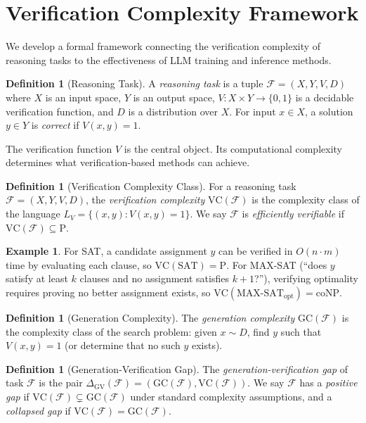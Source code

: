\documentclass{article}
\theoremstyle{definition}
\newtheorem{definition}[theorem]{Definition}
\newtheorem{example}[theorem]{Example}
\theoremstyle{remark}
\newcommand{\PTIME}{\mathrm{P}}
\newcommand{\coNP}{\mathrm{coNP}}
\newcommand{\VC}{\mathrm{VC}}           %
\newcommand{\GC}{\mathrm{GC}}           %
\newcommand{\GVGap}{\Delta_{\mathrm{GV}}} %
\newcommand{\calF}{\mathcal{F}}         %
\begin{document}
\section{Verification Complexity Framework}
\label{sec:framework}

We develop a formal framework connecting the verification complexity of reasoning tasks to the effectiveness of LLM training and inference methods.

\begin{definition}[Reasoning Task]
\label{def:task}
A \emph{reasoning task} is a tuple $\calF = (X, Y, V, D)$ where $X$ is an input space, $Y$ is an output space, $V : X \times Y \to \{0, 1\}$ is a decidable verification function, and $D$ is a distribution over $X$.
For input $x \in X$, a solution $y \in Y$ is \emph{correct} if $V(x, y) = 1$.
\end{definition}

The verification function $V$ is the central object. Its computational complexity determines what verification-based methods can achieve.

\begin{definition}[Verification Complexity Class]
\label{def:vc}
For a reasoning task $\calF = (X, Y, V, D)$, the \emph{verification complexity} $\VC(\calF)$ is the complexity class of the language $L_V = \{(x, y) : V(x, y) = 1\}$.
We say $\calF$ is \emph{efficiently verifiable} if $\VC(\calF) \subseteq \PTIME$.
\end{definition}

\begin{example}
\label{ex:sat}
For SAT, a candidate assignment $y$ can be verified in $O(n \cdot m)$ time by evaluating each clause, so $\VC(\text{SAT}) = \PTIME$.
For MAX-SAT (``does $y$ satisfy at least $k$ clauses and no assignment satisfies $k{+}1$?''), verifying optimality requires proving no better assignment exists, so $\VC(\text{MAX-SAT}_{\text{opt}}) = \coNP$.
\end{example}

\begin{definition}[Generation Complexity]
\label{def:gc}
The \emph{generation complexity} $\GC(\calF)$ is the complexity class of the search problem: given $x \sim D$, find $y$ such that $V(x, y) = 1$ (or determine that no such $y$ exists).
\end{definition}

\begin{definition}[Generation-Verification Gap]
\label{def:gvgap}
The \emph{generation-verification gap} of task $\calF$ is the pair $\GVGap(\calF) = (\GC(\calF), \VC(\calF))$.
We say $\calF$ has a \emph{positive gap} if $\VC(\calF) \subsetneq \GC(\calF)$ under standard complexity assumptions, and a \emph{collapsed gap} if $\VC(\calF) = \GC(\calF)$.
\end{definition}
\end{document}
